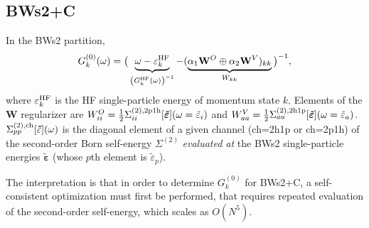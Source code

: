 \documentclass[%
 reprint,
 amsmath,amssymb,
 aps,
]{revtex4-2}
\begin{document}
\subsection{BWs2+C}
In the BWs2 partition,
\begin{equation}
G^{(0)}_k(\omega)
=
\big(\underbrace{ \omega - \varepsilon_k^{\rm HF}}_{\left(G^{\rm{HF}}_k(\omega)\right)^{-1}} -( \underbrace{\alpha_1 \mathbf{W}^O \oplus \alpha_2 \mathbf{W}^V)_{kk}}_{{W}_{kk}} \big)^{-1},
\end{equation}
 where $\varepsilon^{\rm HF}_k$ is the HF single-particle energy of momentum state $k$. Elements of the $\bm{W}$ regularizer are $W^O_{ii}=\frac{1}{2}\Sigma_{ii}^{(2),\rm 2p1h}[\bm{\tilde{\varepsilon}}](\omega = \tilde{\varepsilon}_i)$ and $W^V_{aa}=\frac{1}{2}\Sigma_{aa}^{(2),\rm{2h1p}}[\bm{\tilde{\varepsilon}}](\omega = \tilde{\varepsilon}_a)$. $\Sigma_{pp}^{(2),\rm ch}[\mathbf{\tilde{\varepsilon}}](\omega)$ is the diagonal element of a given channel (ch=2h1p or ch=2p1h) of the second-order Born self-energy $\Sigma^{(2)}$ \emph{evaluated at} the BWs2 single-particle energies $\bm{\tilde{\varepsilon}}$ (whose $p$th element is $\tilde{\varepsilon}_p$). 

The interpretation is that in order to determine $G^{(0)}_k$ for BWs2+C, a self-consistent optimization must first be performed, that requires repeated evaluation of the second-order self-energy, which scales as $O(N^5)$. 
\end{document}
